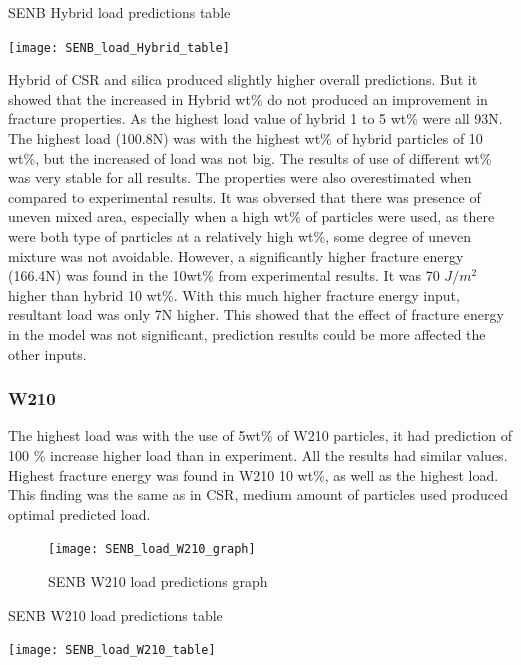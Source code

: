 \documentclass[numbers=noendperiod,chapterprefix=on]{icldt} %
\begin{document}
 \begin{table}
  \centering
  \caption{SENB Hybrid load predictions table}\label{SENB_load_Hybrid_table}
  \texttt{[image: SENB\_load\_Hybrid\_table]}
  \end{table}
  \FloatBarrier 
 
 Hybrid of CSR and silica produced slightly higher overall predictions. But it showed that the increased in Hybrid wt\% do not produced an improvement in fracture properties. As the highest load value of hybrid 1 to 5 wt\% were all 93N. The highest load (100.8N) was with the highest wt\% of hybrid particles of 10 wt\%, but the increased of load was not big. The results of use of different wt\% was very stable for all results. The properties were also overestimated when compared to experimental results. It was obversed that there was presence of uneven mixed area, especially when a high wt\% of particles were used, as there were both type of particles at a relatively high wt\%, some degree of uneven mixture was not avoidable. However, a significantly higher fracture energy (166.4N) was found in the 10wt\% from experimental results. It was 70 $J/m^{2}$ higher than hybrid 10 wt\%. With this much higher fracture energy input, resultant load was only 7N higher. 
 This showed that the effect of fracture energy in the model was not significant, prediction results could be more affected the other inputs.
 
 \subsubsection{W210}
 
 The highest load was with the use of 5wt\% of W210 particles, it had prediction of 100 \% increase higher load than in experiment. All the results had similar values. Highest fracture energy was found in W210 10 wt\%, as well as the highest load. This finding was the same as in CSR, medium amount of particles used produced optimal predicted load.
 
 \begin{figure}[!hp]
  \centering
  \texttt{[image: SENB\_load\_W210\_graph]}\label{SENB_load_W210_graph}
  \caption{SENB W210 load predictions graph}
  \end{figure}
  \FloatBarrier
 
 \begin{table}
   \centering
   \caption{SENB W210 load predictions table}\label{SENB_load_W210_table}
   \texttt{[image: SENB\_load\_W210\_table]}
   \end{table}
   \FloatBarrier
   
\end{document}

